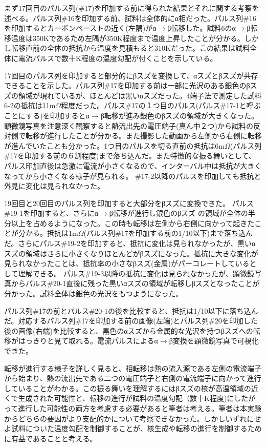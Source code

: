 まず17回目のパルス列(\#17)を印加する前に得られた結果とそれに関する考察を述べる。パルス列\#16を印加する前、試料は全体的にα相だった。パルス列\#16を印加するとカーボンペーストの近く(左隅)がα$\to$β転移した。試料6のα$\to$β転移温度は350Kであるため左隅が350K程度まで温度上昇したことが分かる。しかし転移直前の全体の抵抗から温度を見積もると310Kだった。この結果は試料全体に電流パルスで数十K程度の温度勾配が付くことを示している。

17回目のパルス列を印加すると部分的にβスズを変換して、αスズとβスズが共存できることを示した。パルス列\#17を印加する前は一部に光沢のある銀色のβスズの領域が現れているが、ほとんどは黒いαスズだった。4端子法で測定した試料6-2の抵抗は11m$\Omega$程度だった。パルス\#17の１つ目のパルス(パルス\#17-1と呼ぶことにする)を印加するとα$\to$β転移が進み銀色のβスズの領域が大きくなった。顕微鏡写真を注意深く観察すると熱流出先の電圧端子(真ん中２つ)から試料の反対側で転移が進行したことが分かる。また撮影した動画から左側から右側に転移が進んでいたことも分かった。1つ目のパルスを切る直前の抵抗は6m$\Omega$(パルス列\#17を印加する前の６割程度)まで落ち込んだ。また特徴的な振る舞いとして、パルス印加直後は急激に電流が小さくなるので、インターバル中は抵抗が大きくなってから小さくなる様子が見られる。
\#17-2以降のパルスを印加しても抵抗と外見に変化は見られなかった。

19回目と20回目のパルス列を印加すると大部分をβスズに変換できた。
パルス\#19-1を印加すると、さらにα$\to$β転移が進行し銀色のβスズ
の領域が全体の半分以上を占めるようになった。この時も転移は左側から右側に向かって起きたことが分かる。抵抗は1m$\Omega$(パルス列\#17を印加する前の1/10以下)まで落ち込んだ。さらにパルス\#19-2を印加すると、抵抗に変化は見られなかったが、黒いαスズの領域はさらに小さくなりほとんどがβスズになった。抵抗に大きな変化が見られなかったことは、抵抗率の小さなβスズ(金属)がパーコレートしているとして理解できる。
パルス\#19-3以降の抵抗に変化は見られなかったが、顕微鏡写真からパルス\#20-1直後に残った黒いαスズの領域が転移しβスズとなったことが分かった。試料全体は銀色の光沢をもつようになった。

パルス列\#17の前とパルス\#20-1の後を比較すると、抵抗は1/10以下に落ち込んだ。対応するパルス列\#17を印加する前の画像(左端)とパルス列\#20を印加した後の画像(右端)を比較すると、黒色のαスズから金属的な光沢を持つβスズへの転移がはっきりと見て取れる。電流パルスによるα$\to$β変換を顕微鏡写真で可視化できた。

転移が進行する様子を詳しく見ると、相転移は熱の流入源である左側の電流端子から始まり、熱の流出先である二つの電圧端子と右側の電流端子に向かって進行していることがわかる。この振る舞いを理解するにはβスズの核が高温領域の近くで生成された可能性と、転移の進行が試料の温度勾配（数十K程度)にしたがって進行した可能性の両方を考慮する必要があると筆者は考える。筆者は本実験からどちらの要因がより支配的かについて考察できなかった。しかしいずれにせよ試料についた温度勾配を制御することが、核生成や転移の進行を制御するために有益であることと考える。

